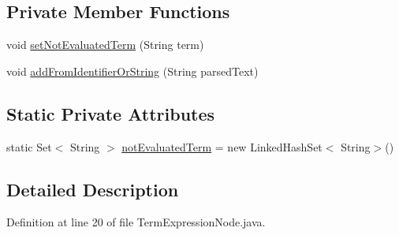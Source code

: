 \subsection*{Private Member Functions}
\begin{DoxyCompactItemize}
\item 
void \hyperlink{classit_1_1emarolab_1_1cagg_1_1core_1_1language_1_1syntax_1_1expressionTree_1_1expressionNodeType_1_1TermExpressionNode_aab23346f22628eaacfd06c9b609d3411}{set\-Not\-Evaluated\-Term} (String term)
\item 
void \hyperlink{classit_1_1emarolab_1_1cagg_1_1core_1_1language_1_1syntax_1_1expressionTree_1_1expressionNodeType_1_1TermExpressionNode_ae679bb719dc8133813c247de894f8f43}{add\-From\-Identifier\-Or\-String} (String parsed\-Text)
\end{DoxyCompactItemize}
\subsection*{Static Private Attributes}
\begin{DoxyCompactItemize}
\item 
static Set$<$ String $>$ \hyperlink{classit_1_1emarolab_1_1cagg_1_1core_1_1language_1_1syntax_1_1expressionTree_1_1expressionNodeType_1_1TermExpressionNode_a4697c3dfd01abe0b9945c7a93a3380ff}{not\-Evaluated\-Term} = new Linked\-Hash\-Set$<$ String$>$()
\end{DoxyCompactItemize}


\subsection{Detailed Description}


Definition at line 20 of file Term\-Expression\-Node.\-java.



